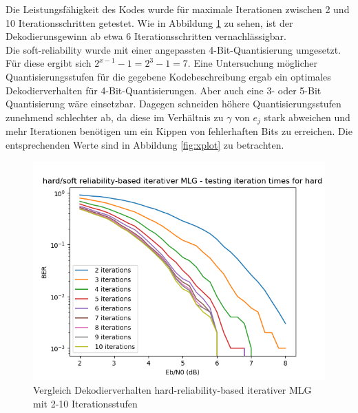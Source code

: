 \documentclass[11pt,a4paper]{article}
\begin{document}
\newpage

Die Leistungsfähigkeit des Kodes wurde für maximale Iterationen zwischen 2 und 10 Iterationsschritten getestet. Wie in Abbildung \ref{fig:iter} zu sehen, ist der Dekodierunsgewinn ab etwa 6 Iterationsschritten vernachlässigbar.\\

Die soft-reliability wurde mit einer angepassten 4-Bit-Quantisierung umgesetzt. Für diese ergibt sich $ 2^{x-1} - 1 = 2^{3} - 1 = 7 $. Eine Untersuchung möglicher Quantisierungsstufen für die gegebene Kodebeschreibung ergab ein optimales Dekodierverhalten für 4-Bit-Quantisierungen. Aber auch eine 3- oder 5-Bit Quantisierung wäre einsetzbar. Dagegen schneiden höhere Quantisierungsstufen zunehmend schlechter ab, da diese im Verhältnis zu $\gamma$ von $e_{j}$ stark abweichen und mehr Iterationen benötigen um ein Kippen von fehlerhaften Bits zu erreichen. Die entsprechenden Werte sind in Abbildung \ref{fig:xplot} zu betrachten.  \\

\begin{figure}[ht]
	\includegraphics[width=\linewidth]{iter.png}
	\caption{Vergleich Dekodierverhalten hard-reliability-based iterativer MLG mit 2-10 Iterationsstufen}
	\label{fig:iter}
\end{figure} 
\end{document}
